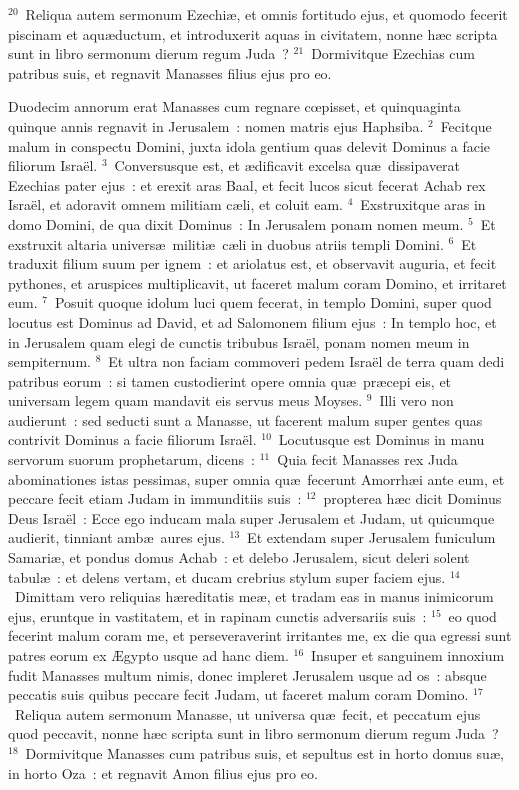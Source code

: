 ${}^{20}$~Reliqua autem sermonum Ezechi\ae , et omnis fortitudo ejus, et quomodo fecerit piscinam et aqu\ae ductum, et introduxerit aquas in civitatem, nonne h\ae c scripta sunt in libro sermonum dierum regum Juda~?
${}^{21}$~Dormivitque Ezechias cum patribus suis, et regnavit Manasses filius ejus pro eo.

\bchapter
\lettrine[lines=3,image=true,loversize=0.05,lraise=-0.03]{D}{}uodecim annorum erat Manasses cum regnare cœpisset, et quinquaginta quinque annis regnavit in Jerusalem~: nomen matris ejus Haphsiba.
${}^{2}$~Fecitque malum in conspectu Domini, juxta idola gentium quas delevit Dominus a facie filiorum Isra\"el.
${}^{3}$~Conversusque est, et \ae dificavit excelsa qu\ae\ dissipaverat Ezechias pater ejus~: et erexit aras Baal, et fecit lucos sicut fecerat Achab rex Isra\"el, et adoravit omnem militiam c\ae li, et coluit eam.
${}^{4}$~Exstruxitque aras in domo Domini, de qua dixit Dominus~: In Jerusalem ponam nomen meum.
${}^{5}$~Et exstruxit altaria univers\ae\ militi\ae\ c\ae li in duobus atriis templi Domini.
${}^{6}$~Et traduxit filium suum per ignem~: et ariolatus est, et observavit auguria, et fecit pythones, et aruspices multiplicavit, ut faceret malum coram Domino, et irritaret eum.
${}^{7}$~Posuit quoque idolum luci quem fecerat, in templo Domini, super quod locutus est Dominus ad David, et ad Salomonem filium ejus~: In templo hoc, et in Jerusalem quam elegi de cunctis tribubus Isra\"el, ponam nomen meum in sempiternum.
${}^{8}$~Et ultra non faciam commoveri pedem Isra\"el de terra quam dedi patribus eorum~: si tamen custodierint opere omnia qu\ae\ pr\ae cepi eis, et universam legem quam mandavit eis servus meus Moyses.
${}^{9}$~Illi vero non audierunt~: sed seducti sunt a Manasse, ut facerent malum super gentes quas contrivit Dominus a facie filiorum Isra\"el.
${}^{10}$~Locutusque est Dominus in manu servorum suorum prophetarum, dicens~:
${}^{11}$~Quia fecit Manasses rex Juda abominationes istas pessimas, super omnia qu\ae\ fecerunt Amorrh\ae i ante eum, et peccare fecit etiam Judam in immunditiis suis~:
${}^{12}$~propterea h\ae c dicit Dominus Deus Isra\"el~: Ecce ego inducam mala super Jerusalem et Judam, ut quicumque audierit, tinniant amb\ae\ aures ejus.
${}^{13}$~Et extendam super Jerusalem funiculum Samari\ae , et pondus domus Achab~: et delebo Jerusalem, sicut deleri solent tabul\ae~: et delens vertam, et ducam crebrius stylum super faciem ejus.
${}^{14}$~Dimittam vero reliquias h\ae reditatis me\ae , et tradam eas in manus inimicorum ejus, eruntque in vastitatem, et in rapinam cunctis adversariis suis~:
${}^{15}$~eo quod fecerint malum coram me, et perseveraverint irritantes me, ex die qua egressi sunt patres eorum ex \AE gypto usque ad hanc diem.
${}^{16}$~Insuper et sanguinem innoxium fudit Manasses multum nimis, donec impleret Jerusalem usque ad os~: absque peccatis suis quibus peccare fecit Judam, ut faceret malum coram Domino.
${}^{17}$~Reliqua autem sermonum Manasse, ut universa qu\ae\ fecit, et peccatum ejus quod peccavit, nonne h\ae c scripta sunt in libro sermonum dierum regum Juda~?
${}^{18}$~Dormivitque Manasses cum patribus suis, et sepultus est in horto domus su\ae , in horto Oza~: et regnavit Amon filius ejus pro eo.


